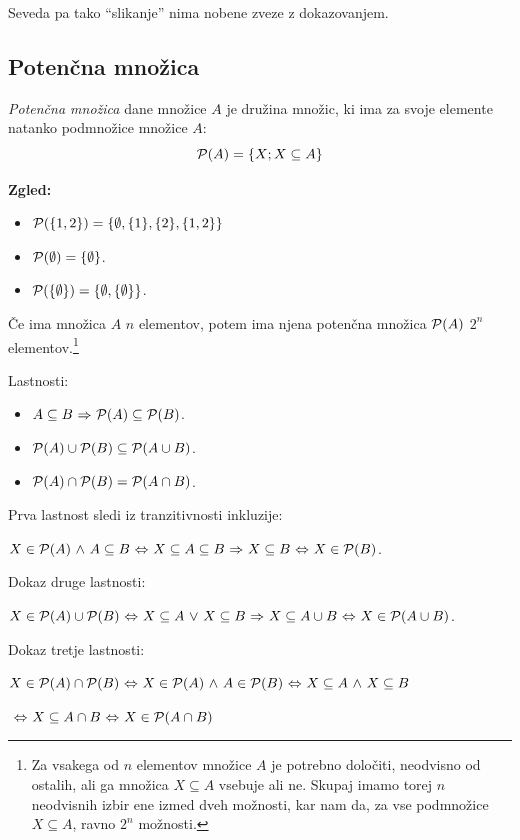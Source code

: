 \documentclass[11pt,paper=b5,footinclude,headinclude]{scrbook} %
\def\P {{\cal P}}
\def\ali {{~\vee~}}
\def\inn {{~\wedge~}}
\def\sledi {{~\Rightarrow~}}
\def\cee {{~\Leftrightarrow~}}
\begin{document}
\medskip
Seveda pa tako ``slikanje'' nima nobene zveze z dokazovanjem.

\subsection{Potenčna množica}

{\em Potenčna množica} dane množice $A$ je družina množic, ki ima za svoje elemente natanko podmnožice množice $A$:
$${\cal P}(A) = \{X; X\subseteq A\}$$

\textbf{ Zgled:}
\begin{itemize}
  \item ${\cal P}(\{1,2\}) = \{\emptyset, \{1\},\{2\},\{1,2\}\}$
  \item ${\cal P}(\emptyset) = \{\emptyset\}$.
  \item ${\cal P}(\{\emptyset\}) = \{\emptyset, \{\emptyset\}\}$.
\end{itemize}

Če ima množica $A$ $n$ elementov, potem ima njena potenčna množica ${\cal P}(A)$ $2^n$ elementov.\footnote{Za vsakega od $n$ elementov množice $A$ je potrebno določiti, neodvisno od ostalih, ali ga množica $X\subseteq A$ vsebuje ali ne. Skupaj imamo torej $n$ neodvisnih izbir ene izmed dveh možnosti, kar nam da, za vse podmnožice $X\subseteq A$, ravno $2^n$ možnosti.}

\bigskip
Lastnosti:
\begin{itemize}
  \item $A\subseteq B\sledi \P(A) \subseteq \P(B)$.
  \item $\P(A) \cup \P(B) \subseteq \P(A\cup B)$.
  \item $\P(A)\cap \P(B) =  \P(A\cap B)$.
\end{itemize}

Prva lastnost sledi iz tranzitivnosti inkluzije:

$X\in \P(A) \inn A\subseteq B\cee X\subseteq A\subseteq B\sledi X\subseteq B\cee X\in \P(B)$.

Dokaz druge lastnosti:

$X\in \P(A) \cup \P(B) \cee X\subseteq A\ali X\subseteq B\sledi X\subseteq A\cup B\cee X\in \P(A\cup B)$.


Dokaz tretje lastnosti:

$X\in \P(A)\cap \P(B)\cee X\in \P(A) \inn A\in \P(B)\cee X\subseteq A \inn X\subseteq B$

$\cee X\subseteq A \cap B\cee X\in \P(A\cap B)$

%
\end{document}
